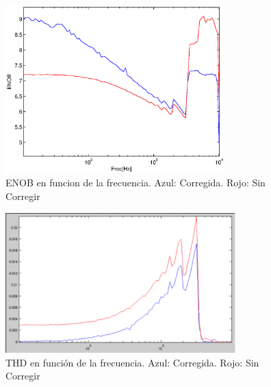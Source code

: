 \documentclass[a4paper,conference]{IEEEtran}
\begin{document}
\begin{figure}[!b]
\centering
\includegraphics[width=3.33in]{Medicion_ENOB}
\caption{ENOB en funcion de la frecuencia. Azul: Corregida. Rojo: Sin Corregir}
\label{fig:ENOB}
\end{figure}

\begin{figure}[!t]
\centering
\includegraphics[width=3.5in]{Medicion_THD}
\caption{THD en función de la frecuencia. Azul: Corregida. Rojo: Sin Corregir}
\label{fig:THD}
\end{figure}
\end{document}
